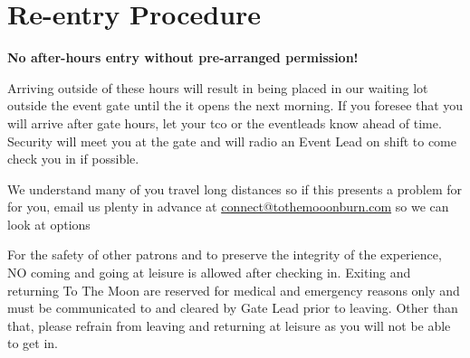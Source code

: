 \section*{Re-entry Procedure}






\textbf{No after-hours entry without pre-arranged permission!}

Arriving outside of these hours will result in being placed in our waiting lot outside the event gate until the it opens the next morning. If you foresee that you will arrive after gate hours, let your \gls{tco} or the \gls{eventleads} know ahead of time. Security will meet you at the \gls{gate} and will radio an Event Lead on shift to come check you in if possible.

We understand many of you travel long distances so if this presents a problem for for you, email us plenty in advance at \url{connect@tothemooonburn.com} so we can look at options

For the safety of other patrons and to preserve the integrity of the experience, NO coming and going at leisure is allowed after checking in. Exiting and returning To The Moon are reserved for medical and emergency reasons only and must be communicated to and cleared by Gate Lead prior to leaving. Other than that, please refrain from leaving and returning at leisure as you will not be able to get in.

